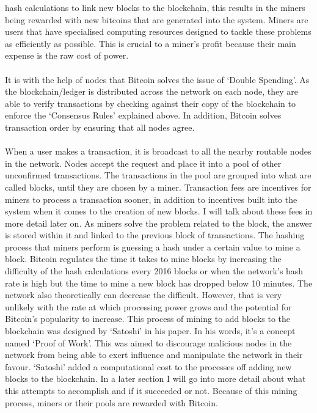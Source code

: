 \documentclass[10pt, a4paper]{report}
\begin{document}
hash calculations to link new blocks to the blockchain, this results in the miners
being rewarded with new bitcoins that are generated into the system.
Miners are users that have specialised computing resources designed to tackle
these problems as efficiently as possible. This is crucial to a miner's profit because their main
expense is the raw cost of power.
\\\\
It is with the help of nodes that Bitcoin solves the issue of `Double Spending'.
As the blockchain/ledger is distributed across the network on each node, they are able
to verify transactions by checking against their copy of the blockchain to enforce the `Consensus Rules' explained above.
In addition, Bitcoin solves transaction order by ensuring that all nodes agree.
\\\\
When a user makes a transaction, it is broadcast to all the nearby routable nodes in the network.
Nodes accept the request and place it into a pool of other unconfirmed transactions.
The transactions in the pool are grouped into what are called blocks, until they are chosen by a miner.
Transaction fees are incentives for miners to process a transaction sooner, in addition to incentives built into the
system when it comes to the creation of new blocks. I will talk about these fees in more detail later on.
As miners solve the problem related to the block,
the answer is stored within it and linked to the previous block of transactions.
The hashing process that miners perform is guessing a hash under a certain value to mine a block.
Bitcoin regulates the time it takes to mine blocks by increasing the difficulty of the
hash calculations every 2016 blocks or when the network's hash rate is high but the time
to mine a new block has dropped below 10 minutes. The network also theoretically can decrease
the difficult. However, that is very unlikely with the rate at which processing power grows and
the potential for Bitcoin's popularity to increase.
This process of mining to add blocks to the blockchain was designed
by `Satoshi' in his paper. In his words, it's a concept named `Proof of Work'.
This was aimed to discourage malicious nodes in the network from being able
to exert influence and manipulate the network in their favour.
`Satoshi' added a computational cost to the processes off adding new blocks to the blockchain.
In a later section I will go into more detail about what this attempts to accomplish and if it succeeded or not.
Because of this mining process, miners or their pools are rewarded with Bitcoin.
\end{document}
